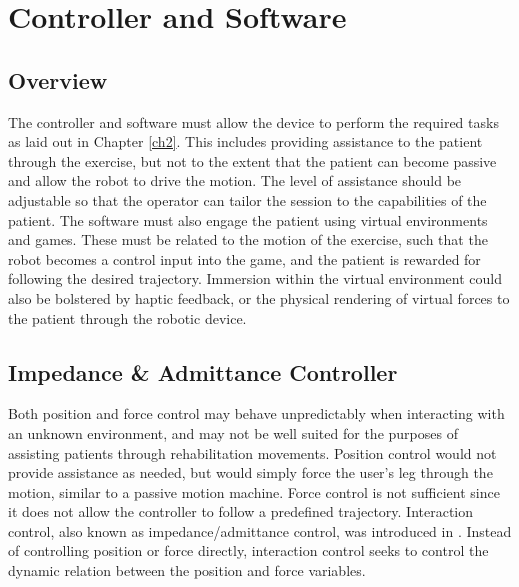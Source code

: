 \documentclass[12pt]{report}
\begin{document}
\chapter{Controller and Software} \label{ch3}


	\section{Overview}
	
	The controller and software must allow the device to perform the required tasks as laid out in Chapter \ref{ch2}. This includes providing assistance to the patient through the exercise, but not to the extent that the patient can become passive and allow the robot to drive the motion. The level of assistance should be adjustable so that the operator can tailor the session to the capabilities of the patient. The software must also engage the patient using virtual environments and games. These must be related to the motion of the exercise, such that the robot becomes a control input into the game, and the patient is rewarded for following the desired trajectory. Immersion within the virtual environment could also be bolstered by haptic feedback, or the physical rendering of virtual forces to the patient through the robotic device. 
	

	
	\section{Impedance \& Admittance Controller} \label{Sec:imp}

%

Both position and force control may behave unpredictably when interacting with an unknown environment, and may not be well suited for the purposes of assisting patients through rehabilitation movements. Position control would not provide assistance as needed, but would simply force the user's leg through the motion, similar to a passive motion machine. Force control is not sufficient since it does not allow the controller to follow a predefined trajectory. Interaction control, also known as impedance/admittance control, was introduced in \cite{Hogan1985}. Instead of controlling position or force directly, interaction control seeks to control the dynamic relation between the position and force variables. 
	
\end{document}
